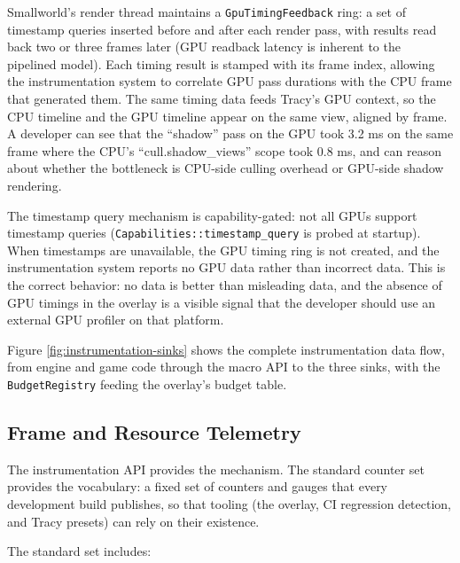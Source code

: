 \documentclass[
  11pt,
  letterpaper,
  DIV=11,
  numbers=noendperiod,
  twoside,
  open=right]{scrreprt}
\begin{document}
Smallworld's render thread maintains a \texttt{GpuTimingFeedback} ring:
a set of timestamp queries inserted before and after each render pass,
with results read back two or three frames later (GPU readback latency
is inherent to the pipelined model). Each timing result is stamped with
its frame index, allowing the instrumentation system to correlate GPU
pass durations with the CPU frame that generated them. The same timing
data feeds Tracy's GPU context, so the CPU timeline and the GPU timeline
appear on the same view, aligned by frame. A developer can see that the
``shadow'' pass on the GPU took 3.2 ms on the same frame where the CPU's
``cull.shadow\_views'' scope took 0.8 ms, and can reason about whether
the bottleneck is CPU-side culling overhead or GPU-side shadow
rendering.

The timestamp query mechanism is capability-gated: not all GPUs support
timestamp queries (\texttt{Capabilities::timestamp\_query} is probed at
startup). When timestamps are unavailable, the GPU timing ring is not
created, and the instrumentation system reports no GPU data rather than
incorrect data. This is the correct behavior: no data is better than
misleading data, and the absence of GPU timings in the overlay is a
visible signal that the developer should use an external GPU profiler on
that platform.

Figure \ref{fig:instrumentation-sinks} shows the complete
instrumentation data flow, from engine and game code through the macro
API to the three sinks, with the \texttt{BudgetRegistry} feeding the
overlay's budget table.



\subsection{Frame and Resource Telemetry}\label{sec-telemetry}

The instrumentation API provides the mechanism. The standard counter set
provides the vocabulary: a fixed set of counters and gauges that every
development build publishes, so that tooling (the overlay, CI regression
detection, and Tracy presets) can rely on their existence.

The standard set includes:
\end{document}
